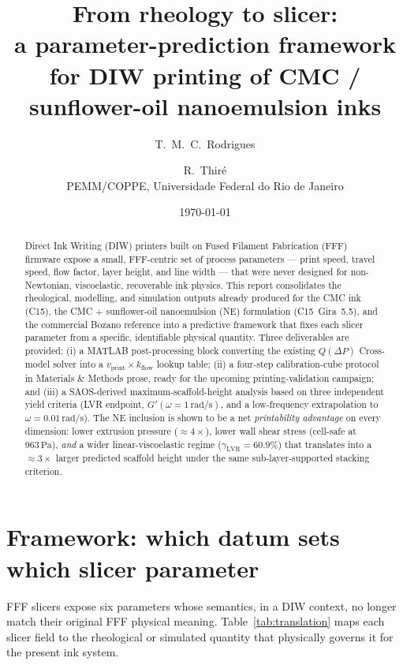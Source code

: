 \documentclass[11pt,a4paper]{article}
\title{\textbf{From rheology to slicer:\\ a parameter-prediction framework for DIW printing of CMC / sunflower-oil nanoemulsion inks}}
\author{T.~M.~C.~Rodrigues \and R.~Thir\'e \\[2pt]
\small PEMM/COPPE, Universidade Federal do Rio de Janeiro}
\date{\today}
\newcommand{\Pa}{\,\mathrm{Pa}}
\begin{document}
\maketitle

\begin{abstract}
\noindent
Direct Ink Writing (DIW) printers built on Fused Filament Fabrication (FFF) firmware
expose a small, FFF-centric set of process parameters --- print speed, travel speed,
flow factor, layer height, and line width --- that were never designed for
non-Newtonian, viscoelastic, recoverable ink physics. This report consolidates the
rheological, modelling, and simulation outputs already produced for the CMC ink
(C15), the CMC + sunflower-oil nanoemulsion (NE) formulation (C15~Gira~5.5), and the
commercial Bozano reference into a predictive framework that fixes each slicer
parameter from a specific, identifiable physical quantity. Three deliverables are
provided: (i) a MATLAB post-processing block converting the existing
$Q(\Delta P)$ Cross-model solver into a $v_\mathrm{print}\times k_\mathrm{flow}$
lookup table; (ii) a four-step calibration-cube protocol in Materials \& Methods
prose, ready for the upcoming printing-validation campaign; and (iii) a SAOS-derived
maximum-scaffold-height analysis based on three independent yield criteria
(LVR endpoint, $G'(\omega=1\,\mathrm{rad/s})$, and a low-frequency extrapolation to
$\omega = 0.01\,\mathrm{rad/s}$). The NE inclusion is shown to be a net
\emph{printability advantage} on every dimension: lower extrusion pressure
($\approx 4\times$), lower wall shear stress (cell-safe at $963\Pa$), \emph{and}
a wider linear-viscoelastic regime ($\gamma_\mathrm{LVR}=60.9\%$) that translates
into a $\approx 3\times$ larger predicted scaffold height under the same
sub-layer-supported stacking criterion.
\end{abstract}

\section{Framework: which datum sets which slicer parameter}
\label{sec:framework}

FFF slicers expose six parameters whose semantics, in a DIW context, no longer
match their original FFF physical meaning. Table~\ref{tab:translation} maps each
slicer field to the rheological or simulated quantity that physically governs it
for the present ink system.
\end{document}
